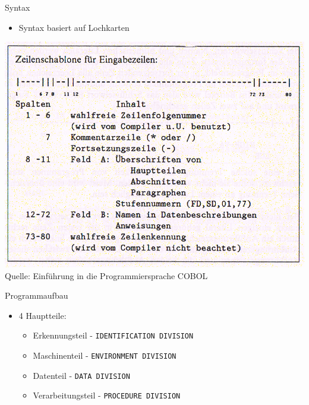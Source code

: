 \begin{slide}{Syntax}
	\begin{itemize}
		\item{Syntax basiert auf Lochkarten}
	\end{itemize}
	\includegraphics[scale=0.8]{syntax}\\
	Quelle: Einführung in die Programmiersprache COBOL
\end{slide}

\begin{slide}{Programmaufbau}
	\begin{itemize}
		\item{4 Hauptteile:
			\begin{itemize}
				\item{Erkennungsteil - \texttt{IDENTIFICATION DIVISION} }
				\item{Maschinenteil - \texttt{ENVIRONMENT DIVISION}}
				\item{Datenteil - \texttt{DATA DIVISION}}
				\item{Verarbeitungsteil - \texttt{PROCEDURE DIVISION}}
			\end{itemize}		
		}
	\end{itemize}
\end{slide}

